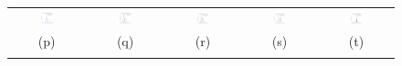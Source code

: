 \documentclass{IEEEtran}
\begin{document}
\begin{figure}[t]
\begin{tabular}{@{}c c c c c@{}}
\includegraphics[width=0.18\textwidth]{figs/synthetic/syn_lines_gabor_responses_cdf_0} &
\includegraphics[width=0.18\textwidth]{figs/synthetic/syn_lines_gabor_responses_cdf_1} &
\includegraphics[width=0.18\textwidth]{figs/synthetic/syn_lines_gabor_responses_cdf_2} &
\includegraphics[width=0.18\textwidth]{figs/synthetic/syn_lines_gabor_responses_cdf_3} &
\includegraphics[width=0.18\textwidth]{figs/retina/ret_vessels_gabor_responses_cdf} \\
(p) & (q) & (r) & (s) & (t)\\
\noalign{\smallskip}


\end{tabular}
\end{figure}
\end{document}

